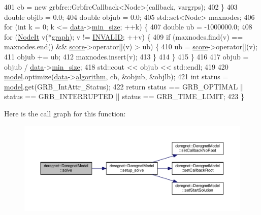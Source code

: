 \begin{DoxyCode}
401         cb = \textcolor{keyword}{new} grbfrc::GrbfrcCallback<Node>(callback, vargrps);
402     \}
403     \textcolor{keywordtype}{double} objlb = 0.0;
404     \textcolor{keywordtype}{double} objub = 0.0;
405     std::set<Node> maxnodes;
406     \textcolor{keywordflow}{for} (\textcolor{keywordtype}{int} k = 0; k <= \hyperlink{classderegnet_1_1DeregnetModel_ad5399761cf6293a702f3800bda4806d1}{data}->\hyperlink{classderegnet_1_1AvgdrgntData_a733e0cd627433fca043a7f9b70af18c3}{min\_size}; ++k) \{
407         \textcolor{keywordtype}{double} ub = -1000000.0;
408         \textcolor{keywordflow}{for} (\hyperlink{namespacederegnet_ac34314e1b5f456fc6d1bb9d96316de4a}{NodeIt} v(*\hyperlink{classderegnet_1_1DeregnetModel_a3cd2f54b8e061ef5bed32708d9bc1ef1}{graph}); v != \hyperlink{usinglemon_8h_adf770fe2eec438e3758ffe905dbae208}{INVALID}; ++v) \{
409             \textcolor{keywordflow}{if} (maxnodes.find(v) == maxnodes.end() && \hyperlink{classderegnet_1_1DeregnetModel_a46224b0bda5bab796d3b7cb41c184a4d}{score}->operator[](v) > ub) \{
410                 ub = \hyperlink{classderegnet_1_1DeregnetModel_a46224b0bda5bab796d3b7cb41c184a4d}{score}->operator[](v);
411                 objub += ub;
412                 maxnodes.insert(v);
413             \}
414         \}
415     \}
416 
417     objub = objub / \hyperlink{classderegnet_1_1DeregnetModel_ad5399761cf6293a702f3800bda4806d1}{data}->\hyperlink{classderegnet_1_1AvgdrgntData_a733e0cd627433fca043a7f9b70af18c3}{min\_size};
418     std::cout << objub << std::endl;
419 
420     \hyperlink{classderegnet_1_1DeregnetModel_a30d525de2086e342b33fe3e45ede4947}{model}.optimize(\hyperlink{classderegnet_1_1DeregnetModel_ad5399761cf6293a702f3800bda4806d1}{data}->\hyperlink{classderegnet_1_1AvgdrgntData_aa75d6acc2d63aa589651c705eaf89280}{algorithm}, cb, &objub, &objlb);
421     \textcolor{keywordtype}{int} status = \hyperlink{classderegnet_1_1DeregnetModel_a30d525de2086e342b33fe3e45ede4947}{model}.get(GRB\_IntAttr\_Status);
422     \textcolor{keywordflow}{return} status == GRB\_OPTIMAL || status == GRB\_INTERRUPTED || status == GRB\_TIME\_LIMIT;
423 \}
\end{DoxyCode}


Here is the call graph for this function\+:\nopagebreak
\begin{figure}[H]
\begin{center}
\leavevmode
\includegraphics[width=350pt]{classderegnet_1_1DeregnetModel_a04b8bcc3b59819f10917a6cbb4dea487_cgraph}
\end{center}
\end{figure}




